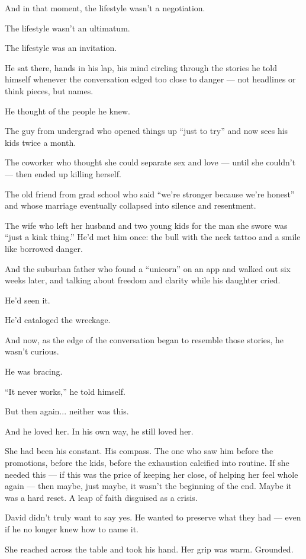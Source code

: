 And in that moment, the lifestyle wasn’t a negotiation.

The lifestyle wasn’t an ultimatum.

The lifestyle was an invitation.

He sat there, hands in his lap, his mind circling through the stories he told himself 
whenever the conversation edged too close to danger —
not headlines or think pieces, but names.

He thought of the people he knew.

The guy from undergrad who opened things up “just to try” and
now sees his kids twice a month.

The coworker who thought she could separate sex and love --- until she couldn’t ---
then ended up killing herself.

The old friend from grad school who said ``we’re stronger because we’re honest''
and whose marriage eventually collapsed into silence and resentment.

The wife who left her husband and two young kids for the man she swore was ``just a kink thing.''
He’d met him once: the bull with the neck tattoo and a smile like borrowed danger.

And the suburban father who found a ``unicorn'' on an app and walked out six weeks later, and
talking about freedom and clarity while his daughter cried.

He’d seen it.

He’d cataloged the wreckage.

And now, as the edge of the conversation began to resemble those stories,
he wasn’t curious.

He was bracing.

``It never works,'' he told himself.

But then again... neither was this. 

And he loved her. In his own way, he still loved her.

She had been his constant. His compass. The one who saw him before the promotions, before the kids, 
before the exhaustion calcified into routine. If she needed this --- if this was the price of keeping 
her close, of helping her feel whole again --- then maybe, just maybe, it wasn’t the beginning of the 
end. Maybe it was a hard reset. A leap of faith disguised as a crisis.


David didn’t truly want to say yes.  
He wanted to preserve what they had — even if he no longer knew how to name it.

She reached across the table and took his hand. Her grip was warm. Grounded.

